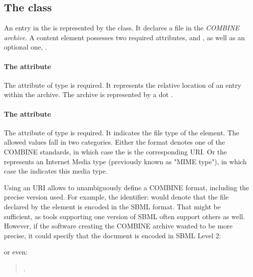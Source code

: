 \subsection{The  class}
\label{content-class}
An entry in the \OmexManifest is represented by the \Content class. It declares a file in the \emph{COMBINE archive}. A content element possesses two required attributes,  and , as well as an optional one, . 

\paragraph{The  attribute}
The  attribute of type 
 is required. It represents the relative location of an entry within the 
archive. The archive is represented by a dot . 

\paragraph{The  attribute}
The  attribute of type  is required. It 
indicates the file type of the \Content element. The allowed values fall in two categories. Either the format 
denotes one of the COMBINE standards, in which case the  
is the corresponding  URI. Or the 
 represents an Internet Media type \citep{rfc2046} (previously known as "MIME type"), in which case the  indicates this media type.

Using an  URI allows to unambiguously define a COMBINE format, including the precise version used. For example, the identifier:  would denote that the file declared by the \Content 
element is encoded in the SBML format. That might be sufficient, as tools supporting one version of SBML often
support others as well. However, if the software creating the COMBINE archive wanted to be more precise, it could specify that the document is encoded in SBML Level 2: 

\begin{quote}
\end{quote}

or even:

\begin{quote}
.
\end{quote}


